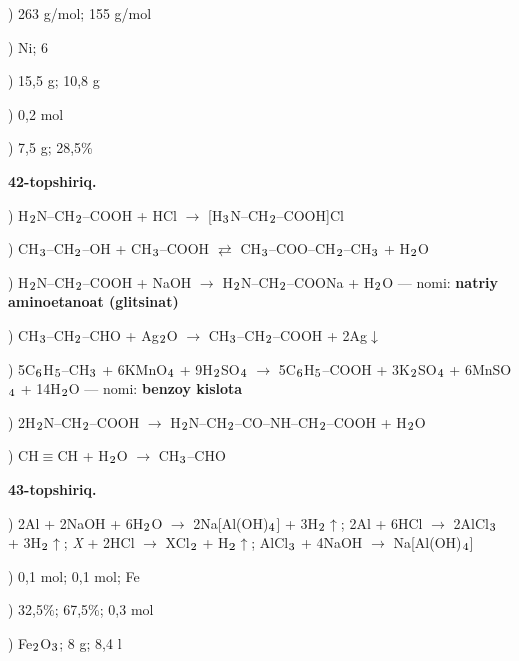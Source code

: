 \documentclass[11pt,a4paper]{article}
\renewcommand{\textsubscript}[1]{\ensuremath{_{\text{\fontsize{8}{8}\selectfont #1}}}}
\begin{document}
) 263 g/mol; 155 g/mol\par
{}) Ni; 6\par
{}) 15,5 g; 10,8 g\par
{}) 0,2 mol\par
{}) 7,5 g; 28,5\%\par
\noindent\textbf{42-topshiriq.}\par
{}) H\textsubscript{2}N--CH\textsubscript{2}--COOH + HCl $\to$ [H\textsubscript{3}N--CH\textsubscript{2}--COOH]Cl\par
{}) CH\textsubscript{3}--CH\textsubscript{2}--OH + CH\textsubscript{3}--COOH $\rightleftarrows$ CH\textsubscript{3}--COO--CH\textsubscript{2}--CH\textsubscript{3} + H\textsubscript{2}O\par
{}) H\textsubscript{2}N--CH\textsubscript{2}--COOH + NaOH $\to$ H\textsubscript{2}N--CH\textsubscript{2}--COONa + H\textsubscript{2}O --- nomi: \textbf{natriy aminoetanoat (glitsinat)}\par
{}) CH\textsubscript{3}--CH\textsubscript{2}--CHO + Ag\textsubscript{2}O $\to$ CH\textsubscript{3}--CH\textsubscript{2}--COOH + 2Ag$\downarrow$\par
{}) 5C\textsubscript{6}H\textsubscript{5}--CH\textsubscript{3} + 6KMnO\textsubscript{4} + 9H\textsubscript{2}SO\textsubscript{4} $\to$ 5C\textsubscript{6}H\textsubscript{5}--COOH + 3K\textsubscript{2}SO\textsubscript{4} + 6MnSO\textsubscript{4} + 14H\textsubscript{2}O --- nomi: \textbf{benzoy kislota}\par
{}) 2H\textsubscript{2}N--CH\textsubscript{2}--COOH $\to$ H\textsubscript{2}N--CH\textsubscript{2}--CO--NH--CH\textsubscript{2}--COOH + H\textsubscript{2}O\par
{}) CH$\equiv$CH + H\textsubscript{2}O $\to$ CH\textsubscript{3}--CHO\par
\noindent\textbf{43-topshiriq.}\par
{}) 2Al + 2NaOH + 6H\textsubscript{2}O $\to$ 2Na[Al(OH)\textsubscript{4}] + 3H\textsubscript{2}$\uparrow$; 2Al + 6HCl $\to$ 2AlCl\textsubscript{3} + 3H\textsubscript{2}$\uparrow$; \textit{X} + 2HCl $\to$ XCl\textsubscript{2} + H\textsubscript{2}$\uparrow$; AlCl\textsubscript{3} + 4NaOH $\to$ Na[Al(OH)\textsubscript{4}]\par
{}) 0,1 mol; 0,1 mol; Fe\par
{}) 32,5\%; 67,5\%; 0,3 mol\par
{}) Fe\textsubscript{2}O\textsubscript{3}; 8 g; 8,4 l\par
\end{document}

